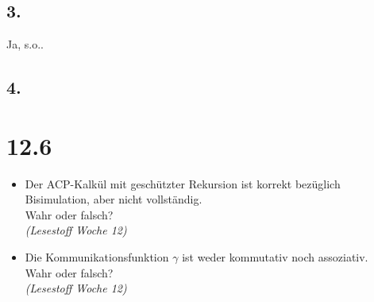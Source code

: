 \documentclass[12pt, paper=a4]{article}
\begin{document}
\subsection*{3.}
Ja, s.o..
\subsection*{4.}


\section*{12.6}
	\begin{itemize}
	\item Der ACP-Kalk\"ul mit gesch\"utzter Rekursion ist korrekt bez\"uglich Bisimulation, aber nicht vollst\"andig.\\
		Wahr oder falsch?\\
		\textit{(Lesestoff Woche 12)}
	\item Die Kommunikationsfunktion $\gamma$ ist weder kommutativ noch assoziativ.\\
		Wahr oder falsch?\\
		\textit{(Lesestoff Woche 12)}
	\end{itemize}
\end{document}

